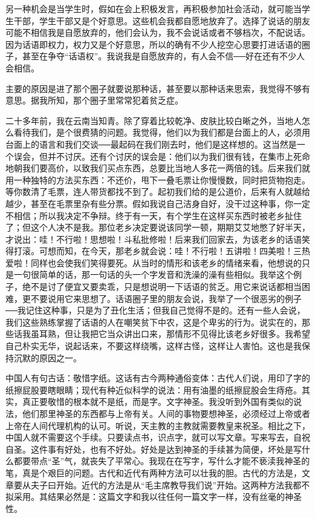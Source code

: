 另一种机会是当学生时，假如在会上积极发言，再积极参加社会活动，就可能当学生干部，学生干部又是个好意思。这些机会我都自愿地放弃了。选择了说话的朋友可能不相信我是自愿放弃的，他们会认为，我不会说话或者不够档次，不配说话。因为话语即权力，权力又是个好意思，所以的确有不少人挖空心思要打进话语的圈子，甚至在争夺“话语权”。我说我是自愿放弃的，有人会不信──好在还有不少人会相信。 

主要的原因是进了那个圈子就要说那种话，甚至要以那种话来思索，我觉得不够有意思。据我所知，那个圈子里常常犯着贫乏症。 

二十多年前，我在云南当知青。除了穿着比较乾净、皮肤比较白晰之外，当地人怎么看待我们，是个很费猜的问题。我觉得，他们以为我们都是台面上的人，必须用台面上的语言和我们交谈──最起码在我们刚去时，他们是这样想的。这当然是一个误会，但并不讨厌。还有个讨厌的误会是：他们以为我们很有钱，在集市上死命地朝我们要高价，以致我们买点东西，总要比当地人多花一两倍的钱。后来我们就用一种独特的方法买东西：不还价，甩下一叠毛票让你慢慢数，同时把货物抱走。等你数清了毛票，连人带货都找不到了。起初我们给的是公道价，后来有人就越给越少，甚至在毛票里杂有些分票。假如我说自己洁身自好，没干过这种事，你一定不相信；所以我决定不争辩。终于有一天，有个学生在这样买东西时被老乡扯住了；但这个人决不是我。那位老乡决定要说该同学一顿，期期艾艾地憋了好半天，才说出：哇！不行啦！思想啦！斗私批修啦！后来我们回家去，为该老乡的话语笑得打滚。可想而知，在今天，那老乡就会说：哇！不行啦！五讲啦！四美啦！三热爱啦！同样也会使我们笑得要死。从当时的情形和该老乡的情绪来看，他想说的只是一句很简单的话，那一句话的头一个字发音和洗澡的澡有些相似。我举这个例子，绝不是讨了便宜又要卖乖，只是想说明一下话语的贫乏。用它来说话都相当困难，更不要说用它来思想了。话语圈子里的朋友会说，我举了一个很恶劣的例子──我记住这种事，只是为了丑化生活；但我自己觉得不是的。还有一些人会说，我们这些熟练掌握了话语的人在嘲笑贫下中农，这是个卑劣的行为。说实在的，那些话我虽耳熟，但让我把它当众讲出口来，那情形不见得比该老乡好很多。我希望自己朴实无华，说起话来，不要这样绕嘴，这样古怪，这样让人害怕。这也是我保持沉默的原因之一。 

中国人有句古话：敬惜字纸。这话有古今两种通俗变体：古代人们说，用印了字的纸擦屁股要瞎眼睛；现代有种近似科学的说法：用有油墨的纸擦屁股会生痔疮。其实，真正要敬惜的根本就不是纸，而是字。文字神圣。我没听到外国有类似的说法，他们那里神圣的东西都与上帝有关。人间的事物要想神圣，必须经过上帝或者上帝在人间代理机构的认可。听说，天主教的主教就需要教皇来祝圣。相比之下，中国人就不需要这个手续。只要读点书，识点字，就可以写文章。写来写去，自祝自圣。这件事有好处，也有不好处。好处是达到神圣的手续甚为简便，坏处是写什么都要带点“圣”气，就丧失了平常心。我现在在写字，写什么才能不亵渎我神圣的笔，真是个艰巨的问题。古代和近代有两种方法可以壮我的胆。古代的方法是，文章要从夫子曰开始。近代的方法是从“毛主席教导我们说”开始。这两种方法我都不拟采用。其结果必然是：这篇文字和我以往任何一篇文字一样，没有丝毫的神圣性。 

